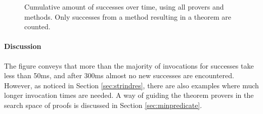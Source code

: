\begin{figure}[h]
\centering
{}
\caption{Cumulative amount of successes over time, using all provers
  and methods. Only successes from a method resulting in a theorem are counted.
\label{fig:provingtime}
}
\end{figure}

\paragraph{Discussion}
The figure conveys that more than the majority of invocations for
successes take less than 50ms, and after 300ms almost no new successes
are encountered. However, as noticed in Section \ref{sec:strindres},
there are also examples where much longer invocation times are
needed. A way of guiding the theorem provers in the search space of
proofs is discussed in Section \ref{sec:minpredicate}.

\begin{comment}
The theorem provers are well suited for these kinds of problems, with
some variance already discussed. This motivates using automated
theorem provers to prove properties about Haskell programs. For the
specific setup, 5 seconds were used as timeout, but one second should
be sufficient, possibly less.
\end{comment}

